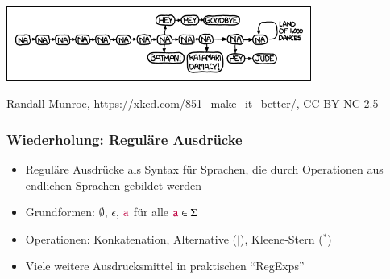 \documentclass[onlymath]{beamer}
\author{\href{http://korrekt.org/}{Markus Kr\"{o}tzsch}\\Daniel Borchmann}
\begin{document}
\maketitle

\begin{frame}\frametitle{}

\includegraphics[width=10cm]{images/xkcd-na_make_it_better}

{\tiny Randall Munroe, \url{https://xkcd.com/851_make_it_better/}, CC-BY-NC 2.5}

\end{frame}



\begin{frame}\frametitle{Wiederholung: Reguläre Ausdrücke}

\begin{itemize}
\item Reguläre Ausdrücke als Syntax für Sprachen, die durch Operationen aus endlichen Sprachen gebildet werden
\item Grundformen: $\emptyset$, $\epsilon$, $\mathtt{\textcolor{purple}{a}}$ für alle $\mathtt{\textcolor{purple}{a}}\in\Sigma$
\item Operationen: Konkatenation, Alternative ($\mid$), Kleene-Stern (${}^*$)
\item Viele weitere Ausdrucksmittel in praktischen "`RegExps"'
\end{itemize}

\end{frame}
\end{document}
